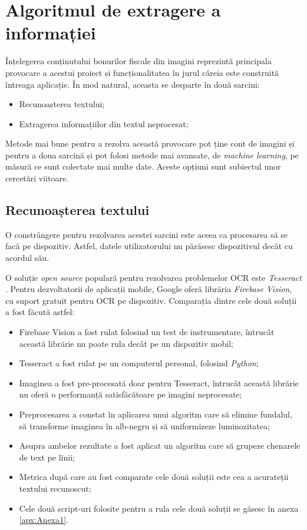 \section{Algoritmul de extragere a informației}

Înțelegerea conținutului bonurilor fiscale din imagini reprezintă principala provocare a acestui proiect și funcționalitatea în jurul căreia este construită întreaga aplicație. În mod natural, aceasta se desparte în două sarcini:

\begin{itemize}
  \item 
  Recunoașterea textului;
  \item
  Extragerea informațiilor din textul neprocesat;
\end{itemize}

Metode mai bune pentru a rezolva această provocare pot ține cont de imagini și pentru a doua sarcină și pot folosi metode mai avansate, de \emph{machine learning}, pe măsură ce sunt colectate mai multe date. Aceste opțiuni sunt subiectul unor cercetări viitoare.

\subsection{Recunoașterea textului}

O constrângere pentru rezolvarea acestei sarcini este aceea ca procesarea să se facă pe dispozitiv. Astfel, datele utilizatorului nu părăsesc dispozitivul decât cu acordul său.

O soluție \emph{open source} populară pentru rezolvarea problemelor OCR este \emph{Tesseract} \cite{Tesseract}. Pentru dezvoltatorii de aplicații mobile, Google oferă librăria \emph{Firebase Vision}, cu suport gratuit pentru OCR pe dispozitiv. Comparația dintre cele două soluții a fost făcută astfel:

\begin{itemize}
  \item 
  Firebase Vision a fost rulat folosind un test de instrumentare, întrucât această librărie nu poate rula decât pe un dispozitiv mobil;
  \item
  Tesseract a fost rulat pe un computerul personal, folosind \emph{Python};
  \item
  Imaginea a fost pre-procesată doar pentru Tesseract, întrucât această librărie nu oferă o performanță satisfăcătoare pe imagini neprocesate;
  \item
  Preprocesarea a constat în aplicarea unui algoritm care să elimine fundalul, să transforme imaginea în alb-negru și să uniformizeze luminozitatea;
  \item
  Asupra ambelor rezultate a fost aplicat un algoritm care să grupeze chenarele de text pe linii;
  \item 
  Metrica după care au fost comparate cele două soluții este cea a acurateții textului recunoscut;
  \item 
  Cele două script-uri folosite pentru a rula cele două soluții se găsesc în anexa \ref{apx:Anexa1}.
\end{itemize}

